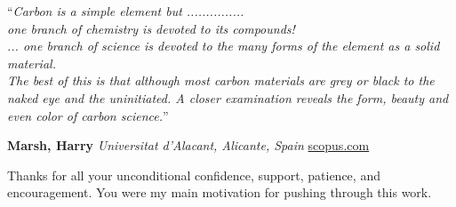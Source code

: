 \documentclass[
11pt, 
oneside,
english,
onehalfspacing,
onehalfspacing,
parskip,
headsepline,
]{MastersDoctoralThesis}
\begin{document}
\begin{center}

\noindent\enquote{\itshape Carbon is a simple element but ............... \\
\medskip 
one branch of chemistry is devoted to its compounds! \\
\medskip 
... one branch of science is devoted to the many forms of the element as a solid material. \\
\medskip 
The best of this is that although most carbon materials are grey or black to the naked eye and the uninitiated. A closer examination reveals the form, beauty and even color of carbon science.}\bigbreak
\end{center}

\begin{flushright}
\textbf{Marsh, Harry} \linebreak
\emph{Universitat d'Alacant, Alicante, Spain} \linebreak
\href{https://www.scopus.com/authid/detail.uri?authorId=7201585695}{scopus.com}
\end{flushright}

\vspace*{\fill}


\begin{dedication}
Thanks for all your unconditional confidence, support, patience, and encouragement. You were my main motivation for pushing through this work.

\end{dedication}

\end{document}
